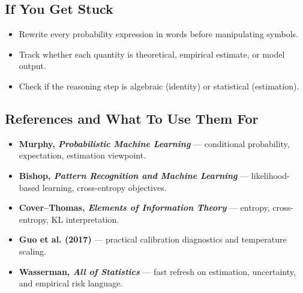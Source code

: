 \subsection*{If You Get Stuck}
\begin{itemize}[leftmargin=1.5em]
  \item Rewrite every probability expression in words before manipulating symbols.
  \item Track whether each quantity is theoretical, empirical estimate, or model output.
  \item Check if the reasoning step is algebraic (identity) or statistical (estimation).
\end{itemize}

\subsection*{References and What To Use Them For}
\begin{itemize}[leftmargin=1.5em]
  \item \textbf{Murphy, \emph{Probabilistic Machine Learning}} --- conditional probability, expectation, estimation viewpoint.
  \item \textbf{Bishop, \emph{Pattern Recognition and Machine Learning}} --- likelihood-based learning, cross-entropy objectives.
  \item \textbf{Cover--Thomas, \emph{Elements of Information Theory}} --- entropy, cross-entropy, KL interpretation.
  \item \textbf{Guo et al. (2017)} --- practical calibration diagnostics and temperature scaling.
  \item \textbf{Wasserman, \emph{All of Statistics}} --- fast refresh on estimation, uncertainty, and empirical risk language.
\end{itemize}
